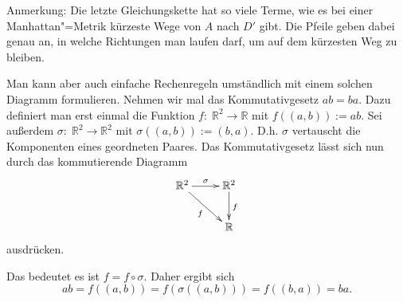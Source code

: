 \documentclass[a4paper,11pt,fleqn,BCOR=20mm,%
twoside,twocolumn,dvipdfmx]{scrartcl}
\begin{document}
Anmerkung: Die letzte Gleichungskette hat so viele Terme,
wie es bei einer Manhattan"=Metrik kürzeste
Wege von $A$ nach $D'$ gibt. Die Pfeile
geben dabei genau an, in welche Richtungen
man laufen darf, um auf dem kürzesten Weg
zu bleiben.

\newpage
Man kann aber auch einfache Rechenregeln umständlich
mit einem solchen Diagramm formulieren. Nehmen wir mal
das Kommutativgesetz $ab=ba$. Dazu definiert man erst einmal
die Funktion $f{:}\;\mathbb R^2\rightarrow\mathbb R$ mit
$f((a,b)):=ab$. Sei außerdem
$\sigma{:}\;\mathbb R^2\rightarrow\mathbb R^2$
mit $\sigma((a,b)):=(b,a)$. D.h. $\sigma$ vertauscht die
Komponenten eines geordneten Paares. Das Kommutativgesetz lässt sich
nun durch das kommutierende Diagramm%
\[\xymatrix{\mathbb R^2 \ar[r]^\sigma \ar[dr]_f &\ar[d]^f \mathbb R^2\\
& \mathbb R}\]
ausdrücken.

Das bedeutet es ist $f=f\circ\sigma$. Daher ergibt sich%
\[ab = f((a,b))=f(\sigma((a,b))) = f((b,a)) = ba.\]
\end{document}
